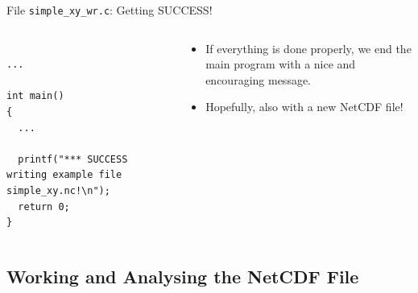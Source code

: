 \documentclass[compress,11pt,xcolor=svgnames,aspectratio=169]{beamer}
\begin{document}
\begin{frame}[fragile]{File \texttt{simple\_xy\_wr.c}: Getting SUCCESS!}

\begin{columns}

\begin{column}{0.5\textwidth}

{\tiny

\begin{verbatim}

...

int main()
{
  ...

  printf("*** SUCCESS writing example file simple_xy.nc!\n");
  return 0;
}

\end{verbatim}

}

\end{column}

\begin{column}{0.5\textwidth}

{\footnotesize

\begin{itemize}
\setlength\itemsep{0.5cm}

\item If everything is done properly, we end the main program with a nice and encouraging message.

\item Hopefully, also with a new NetCDF file!

\end{itemize}

}

\end{column}

\end{columns}

\end{frame}

\subsection{Working and Analysing the NetCDF File}
\end{document}
